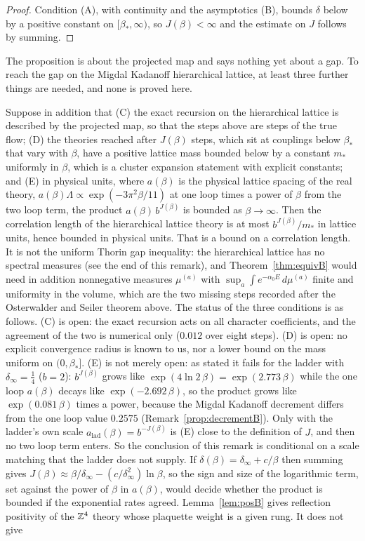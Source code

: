 \begin{proof}
Condition (A), with continuity and the asymptotics (B), bounds $\delta$ below by a positive constant on $[\beta_*,\infty)$, so $J(\beta)<\infty$ and the estimate on $J$ follows by summing.
\end{proof}

The proposition is about the projected map and says nothing yet about a gap. To reach the gap on the Migdal Kadanoff hierarchical lattice, at least three further things are needed, and none is proved here.

\begin{remark}
Suppose in addition that (C) the exact recursion on the hierarchical lattice is described by the projected map, so that the steps above are steps of the true flow; (D) the theories reached after $J(\beta)$ steps, which sit at couplings below $\beta_*$ that vary with $\beta$, have a positive lattice mass bounded below by a constant $m_*$ uniformly in $\beta$, which is a cluster expansion statement with explicit constants; and (E) in physical units, where $a(\beta)$ is the physical lattice spacing of the real theory, $a(\beta)\Lambda\propto\exp(-3\pi^2\beta/11)$ at one loop times a power of $\beta$ from the two loop term, the product $a(\beta)\,b^{J(\beta)}$ is bounded as $\beta\to\infty$. Then the correlation length of the hierarchical lattice theory is at most $b^{J(\beta)}/m_*$ in lattice units, hence bounded in physical units. That is a bound on a correlation length. It is not the uniform Thorin gap inequality: the hierarchical lattice has no spectral measures (see the end of this remark), and Theorem~\ref{thm:equivB} would need in addition nonnegative measures $\mu^{(a)}$ with $\sup_a\int e^{-\alpha_0E}\,d\mu^{(a)}$ finite and uniformity in the volume, which are the two missing steps recorded after the Osterwalder and Seiler theorem above. The status of the three conditions is as follows. (C) is open: the exact recursion acts on all character coefficients, and the agreement of the two is numerical only ($0.012$ over eight steps). (D) is open: no explicit convergence radius is known to us, nor a lower bound on the mass uniform on $(0,\beta_*]$. (E) is not merely open: as stated it fails for the ladder with $\delta_\infty=\frac14$ ($b=2$): $b^{J(\beta)}$ grows like $\exp(4\ln2\,\beta)=\exp(2.773\,\beta)$ while the one loop $a(\beta)$ decays like $\exp(-2.692\,\beta)$, so the product grows like $\exp(0.081\,\beta)$ times a power, because the Migdal Kadanoff decrement differs from the one loop value $0.2575$ (Remark~\ref{prop:decrementB}). Only with the ladder's own scale $a_{\mathrm{lad}}(\beta)=b^{-J(\beta)}$ is (E) close to the definition of $J$, and then no two loop term enters. So the conclusion of this remark is conditional on a scale matching that the ladder does not supply. If $\delta(\beta)=\delta_\infty+c/\beta$ then summing gives $J(\beta)\approx\beta/\delta_\infty-(c/\delta_\infty^2)\ln\beta$, so the sign and size of the logarithmic term, set against the power of $\beta$ in $a(\beta)$, would decide whether the product is bounded if the exponential rates agreed. Lemma~\ref{lem:posB} gives reflection positivity of the $\mathbb{Z}^4$ theory whose plaquette weight is a given rung. It does not give 
\end{remark}
